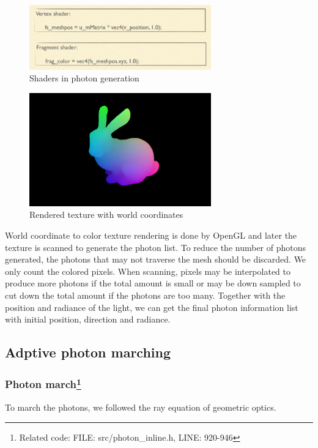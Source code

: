 \documentclass[a4paper]{article}
\begin{document}
\begin{CJK*}{UTF8}{gkai}
\begin{figure}[H]
\centering
\includegraphics[width=0.7\textwidth]{depthshader.png}
\caption{\label{fig:depthshader}Shaders in photon generation}
\end{figure}


\begin{figure}[H]
\centering
\includegraphics[width=0.7\textwidth]{depthcolor.png}
\caption{\label{fig:depthcolor}Rendered texture with world coordinates}
\end{figure}

World coordinate to color texture rendering is done by OpenGL and later the texture is scanned to generate the photon list. To reduce the number of photons generated, the photons that may not traverse the mesh should be discarded. We only count the colored pixels. When scanning, pixels may be interpolated to produce more photons if the total amount is small or may be down sampled to cut down the total amount if the photons are too many. Together with the position and radiance of the light, we can get the final photon information list with initial position, direction and radiance.

\subsection{Adptive photon marching}
\subsubsection[Photon march]{Photon march\footnote{Related code: FILE: src/photon\_inline.h, LINE: 920-946}}
To march the photons, we followed the ray equation of geometric optics.


\end{CJK*}
\end{document}
